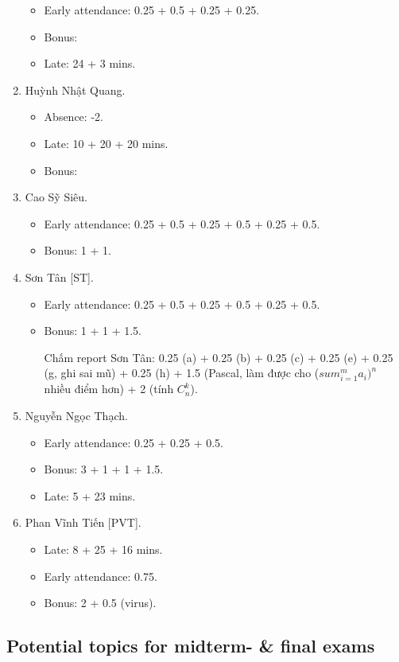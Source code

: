 \documentclass{article}
\begin{document}
\begin{enumerate}
\begin{itemize}
		\item Early attendance: 0.25 + 0.5 + 0.25 + 0.25.
		\item Bonus: 
		\item Late: 24 + 3 mins.
	\end{itemize}
	\item {\sc Huỳnh Nhật Quang.}
	\begin{itemize}
		\item Absence: -2.
		\item Late: 10 + 20 + 20 mins.
		\item Bonus: 
	\end{itemize}
	\item {\sc Cao Sỹ Siêu.}
	\begin{itemize}
		\item Early attendance: 0.25 + 0.5 + 0.25 + 0.5 + 0.25 + 0.5.
		\item Bonus: 1 + 1.
	\end{itemize}
	\item {\sc Sơn Tân [ST].}
	\begin{itemize}
		\item Early attendance: 0.25 + 0.5 + 0.25 + 0.5 + 0.25 + 0.5.
		\item Bonus: 1 + 1 + 1.5.
		
		Chấm report Sơn Tân: 0.25 (a) + 0.25 (b) + 0.25 (c) + 0.25 (e) + 0.25 (g, ghi sai mũ) + 0.25 (h) + 1.5 (Pascal, làm được cho ($sum_{i=1}^m a_i)^n$ nhiều điểm hơn) + 2 (tính $C_n^k$).
	\end{itemize}
	\item {\sc Nguyễn Ngọc Thạch.}
	\begin{itemize}
		\item Early attendance: 0.25 + 0.25 + 0.5.
		\item Bonus: 3 + 1 + 1 + 1.5.
		\item Late: 5 + 23 mins.
	\end{itemize}
	\item {\sc Phan Vĩnh Tiến [PVT].}
	\begin{itemize}
		\item Late: 8 + 25 + 16 mins.
		\item Early attendance: 0.75.
		\item Bonus: 2 + 0.5 (virus).
	\end{itemize}
\end{enumerate}


\subsection{Potential topics for midterm- \& final exams}
\end{document}
